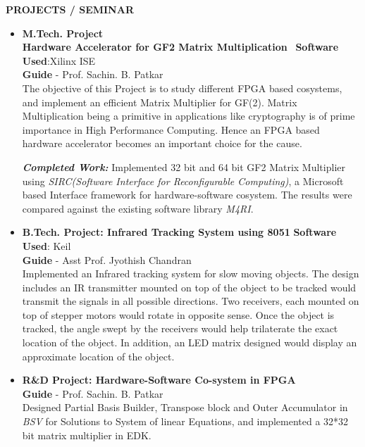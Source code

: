 \documentclass[a4paper,10pt]{article}
\begin{document}
 \colorbox{titleColor}{\parbox{6.5in}{\textbf{PROJECTS / SEMINAR}}}

 \begin{itemize}

\setlength{\itemsep}{1pt}
  \item \textbf{{M.Tech. Project}}\\
	\textbf{Hardware Accelerator for GF2 Matrix Multiplication }\qquad\qquad\qquad\ \textbf{Software Used}:Xilinx ISE\\
	{\textbf{Guide} - Prof. Sachin. B. Patkar\\}
	The objective of this Project is to study different FPGA based cosystems, and implement an efficient Matrix Multiplier for GF(2).
	Matrix Multiplication being a primitive in applications like cryptography is of prime importance in High Performance Computing. 
	Hence an FPGA based hardware accelerator becomes an important choice for the cause. 
	
 \textbf{\textit{Completed Work:}} 
   Implemented 32 bit and 64 bit GF2 Matrix Multiplier using \textit{SIRC(Software Interface for Reconfigurable Computing)}, a Microsoft based Interface framework
   for hardware-software cosystem. The results were compared against the existing software library \textit{M4RI}. 



  \item \textbf{{B.Tech. Project: Infrared Tracking System using 8051}}  \qquad\qquad\qquad\qquad \textbf{Software Used}: Keil\\
        {\textbf{Guide} - Asst Prof. Jyothish Chandran\\}                                                   
	Implemented an Infrared tracking system for slow moving objects. The design includes an IR transmitter mounted on top of the 
	object to be tracked would transmit the signals in all possible directions. Two receivers, each mounted on top of stepper motors
	would rotate in opposite sense. Once the object is tracked, the angle swept by the receivers would help trilaterate the exact location of the object.
	In addition, an LED matrix designed would display an approximate location of the object.

  \item \textbf{{R\&D Project: Hardware-Software Co-system in FPGA}}\\
	{\textbf{Guide} - Prof. Sachin. B. Patkar \qquad\qquad\qquad\quad\qquad\qquad\qquad\quad\qquad\qquad\qquad\qquad\qquad\qquad\quad \\}
	Designed Partial Basis Builder, Transpose block and Outer Accumulator in \textit{BSV} for Solutions to System of linear Equations, and
	implemented a 32*32 bit matrix multiplier in EDK.
	

\end{itemize}
\end{document}
